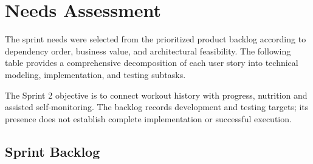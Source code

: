 \documentclass[12pt,a4paper,openany]{report}
\begin{document}
\section{Needs Assessment}

The sprint needs were selected from the prioritized product backlog according to dependency order, business value, and architectural feasibility. The following table provides a comprehensive decomposition of each user story into technical modeling, implementation, and testing subtasks.


The Sprint 2 objective is to connect workout history with progress, nutrition and assisted self-monitoring. The backlog records development and testing targets; its presence does not establish complete implementation or successful execution.


\subsection{Sprint Backlog}
\end{document}
